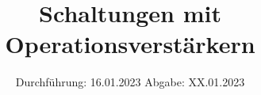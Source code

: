 

\subject{Versuch Nr.V51}
\title{Schaltungen mit Operationsverstärkern}
\date{%
  Durchführung: 16.01.2023
  \hspace{3em}
  Abgabe: XX.01.2023
}



\maketitle
\thispagestyle{empty}
\tableofcontents
\newpage 






%
\newpage

\nocite{*}

\printbibliography{}


